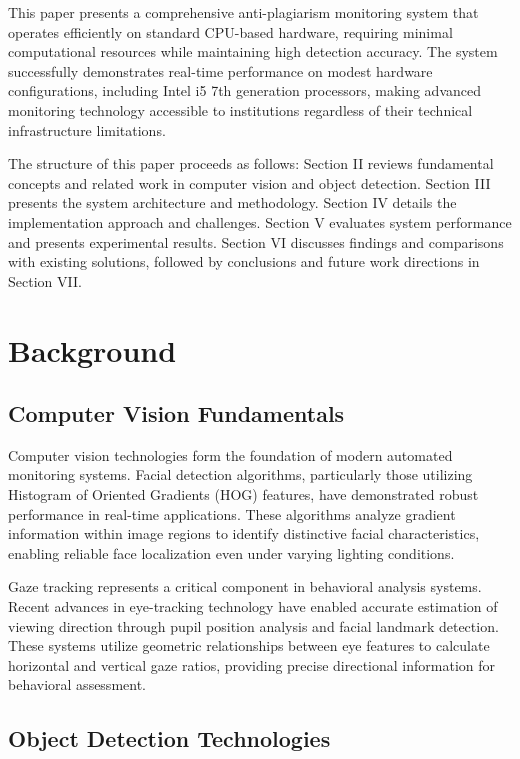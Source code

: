 \documentclass[conference]{IEEEtran}
\begin{document}
This paper presents a comprehensive anti-plagiarism monitoring system that operates efficiently on standard CPU-based hardware, requiring minimal computational resources while maintaining high detection accuracy. The system successfully demonstrates real-time performance on modest hardware configurations, including Intel i5 7th generation processors, making advanced monitoring technology accessible to institutions regardless of their technical infrastructure limitations.

The structure of this paper proceeds as follows: Section II reviews fundamental concepts and related work in computer vision and object detection. Section III presents the system architecture and methodology. Section IV details the implementation approach and challenges. Section V evaluates system performance and presents experimental results. Section VI discusses findings and comparisons with existing solutions, followed by conclusions and future work directions in Section VII.

\section{Background}

\subsection{Computer Vision Fundamentals}

Computer vision technologies form the foundation of modern automated monitoring systems. Facial detection algorithms, particularly those utilizing Histogram of Oriented Gradients (HOG) features, have demonstrated robust performance in real-time applications\cite{hasan2021face}. These algorithms analyze gradient information within image regions to identify distinctive facial characteristics, enabling reliable face localization even under varying lighting conditions.

Gaze tracking represents a critical component in behavioral analysis systems. Recent advances in eye-tracking technology have enabled accurate estimation of viewing direction through pupil position analysis and facial landmark detection\cite{dilini2021cheating}. These systems utilize geometric relationships between eye features to calculate horizontal and vertical gaze ratios, providing precise directional information for behavioral assessment\cite{el2023drowsiness}.

\subsection{Object Detection Technologies}
\end{document}
